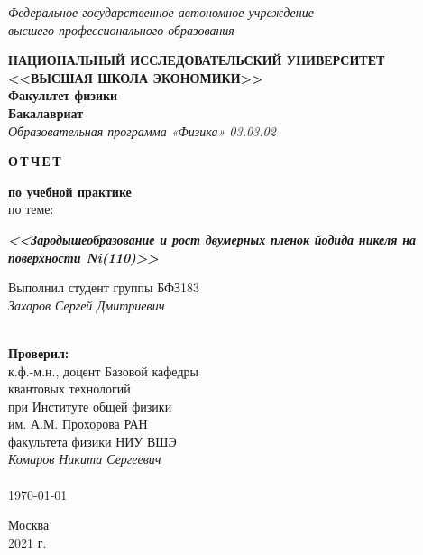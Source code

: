 \thispagestyle{empty}

\begin{center}
	\textit{Федеральное государственное автономное учреждение \\
		высшего профессионального образования}
	\vspace{0.5ex}
	
	\textbf{НАЦИОНАЛЬНЫЙ ИССЛЕДОВАТЕЛЬСКИЙ УНИВЕРСИТЕТ \\ <<ВЫСШАЯ ШКОЛА ЭКОНОМИКИ>>}\\
	\vspace{0.5ex}
	\textbf{Факультет физики}\\
	\vspace{0.5ex}
	\textbf{Бакалавриат}\\
	\vspace{0.5ex}
	\small{\textit{Образовательная программа «Физика» 03.03.02}}
\end{center}
\vspace{7ex}

\begin{center}
	\vspace{2ex}
	{\Large\textbf{О\,Т\,Ч\,Е\,Т}}
	
	{\large\textbf{по учебной практике}} \\
	\vspace{1ex}	
	{по теме:}
	
	\Large{\textbf{\textit{<<Зародышеобразование и рост двумерных пленок йодида никеля
			на поверхности  Ni(110)>>}}}
	

\end{center}
\begin{flushright}
\vspace{30ex}
	\noindent
	Выполнил студент группы БФЗ183\\
	\textit{Захаров Сергей Дмитриевич}\\
\vspace{2ex}
\underline{\hspace{3cm}}\\
  
\end{flushright}
\begin{flushleft}
\vspace{1ex}
	\noindent
	\textbf{Проверил:}\\
	к.ф.-м.н.,
доцент Базовой кафедры\\
квантовых технологий\\
при Институте общей физики\\
им. А.М. Прохорова РАН\\
факультета физики НИУ ВШЭ\\

\textit{Комаров Никита Сергеевич}\\
\vspace{2ex}
\underline{\hspace{3cm}}\\
\vspace{2ex}
\today
\end{flushleft}

\begin{center}
    	\vfill
	Москва \\2021 г.
\end{center}


\newpage